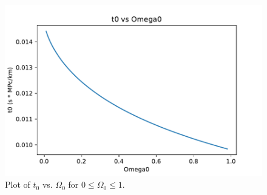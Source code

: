 \begin{figure}[htbp]
    \centering
    \includegraphics[scale=0.7]{Images/Q5-4.pdf}
    \caption{Plot of $t_0$ vs. $\Omega_0$ for $0 \leq \Omega_0 \leq 1$.}
    \label{plot54}
\end{figure}

